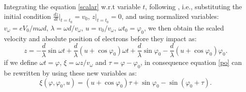 \documentclass[aps,prstab,superscriptaddress,showpacs]{revtex4-1}
\begin{document}
Integrating the equation \eqref{scalar} w.r.t variable $t$, following \cite{PP}, i.e., substituting the initial condition $\displaystyle \frac{dz}{dt}|_{t=t_0}=v_{0}$, $z|_{t=t_0}=0$, and using normalized variables:  $v_{\omega}=eV_0/m\omega d $, $\lambda=\omega d/v_{\omega}$, $u=v_{0}/v_{\omega}$, $\omega t_0=\varphi_0$, we then obtain the scaled velocity and absolute position of electrons before they impact as: 
\begin{equation}
z=-\frac{d}{\lambda}\sin\omega t+\frac{d}{\lambda}(u+\cos\varphi_0)\omega t+\frac{d}{\lambda}\sin\varphi_0-\frac{d}{\lambda}(u+\cos\varphi_0)\varphi_0.\label{po}
\end{equation}
if we define $\omega t=\varphi$, $\xi=\omega z/v_{\omega}$ and $\tau=\varphi-\varphi_0$, in consequence equation \eqref{po} can be rewritten by using these new variables as:
\begin{equation}
\xi(\varphi,\varphi_0,u) = (u+\cos \varphi_0)\tau+\sin \varphi_0 - \sin (\varphi_0+\tau).\label{nposition}
\end{equation}
\end{document}
